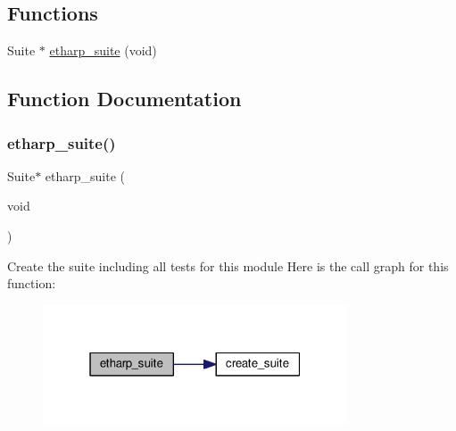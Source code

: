 \subsection*{Functions}
\begin{DoxyCompactItemize}
\item 
Suite $\ast$ \hyperlink{openmote-cc2538_2lwip_2test_2unit_2etharp_2test__etharp_8h_a85ab39f7a5485db276c4afe2dcc02e7c}{etharp\+\_\+suite} (void)
\end{DoxyCompactItemize}


\subsection{Function Documentation}
\mbox{\label{openmote-cc2538_2lwip_2test_2unit_2etharp_2test__etharp_8h_a85ab39f7a5485db276c4afe2dcc02e7c}} 
\subsubsection{\texorpdfstring{etharp\+\_\+suite()}{etharp\_suite()}}
{\footnotesize\ttfamily Suite$\ast$ etharp\+\_\+suite (\begin{DoxyParamCaption}\item[{void}]{ }\end{DoxyParamCaption})}

Create the suite including all tests for this module Here is the call graph for this function\+:
\nopagebreak
\begin{figure}[H]
\begin{center}
\leavevmode
\includegraphics[width=256pt]{openmote-cc2538_2lwip_2test_2unit_2etharp_2test__etharp_8h_a85ab39f7a5485db276c4afe2dcc02e7c_cgraph}
\end{center}
\end{figure}
